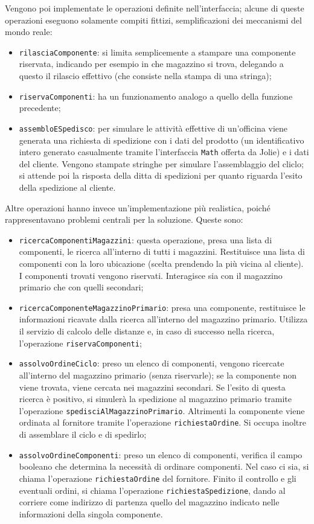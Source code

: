 Vengono poi implementate le operazioni definite nell'interfaccia;
alcune di queste operazioni eseguono solamente compiti fittizi,
semplificazioni dei meccanismi del mondo reale:
\begin{itemize}
  \item {\tt rilasciaComponente}: si limita semplicemente a stampare una
  componente riservata, indicando per esempio in che magazzino si trova,
  delegando a questo il rilascio effettivo (che consiste nella stampa di
  una stringa);
  \item {\tt riservaComponenti}: ha un funzionamento analogo a quello
  della funzione precedente;
  \item {\tt assembloESpedisco}: per simulare le attivit\`a effettive di
  un'officina viene generata una richiesta di spedizione con i dati del
  prodotto (un identificativo intero generato casualmente tramite
  l'interfaccia {\tt Math} offerta da Jolie) e i dati del cliente.
  Vengono stampate stringhe per simulare l'assemblaggio del cliclo; si
  attende poi la risposta della ditta di spedizioni per quanto riguarda
  l'esito della spedizione al cliente.
\end{itemize}
Altre operazioni hanno invece un'implementazione pi\`u realistica,
poich\'e rappresentavano problemi centrali per la soluzione. Queste
sono:
\begin{itemize}
  \item {\tt ricercaComponentiMagazzini}: questa operazione, presa una
  lista di componenti, le ricerca all'interno di tutti i magazzini.
  Restituisce una lista di componenti con la loro ubicazione (scelta
  prendendo la pi\`u vicina al cliente). I componenti trovati vengono
  riservati. Interagisce sia con il magazzino primario che con quelli
  secondari;
  \item {\tt ricercaComponenteMagazzinoPrimario}: presa una componente,
  restituisce le informazioni ricavate dalla ricerca all'interno del
  magazzino primario. Utilizza il servizio di calcolo delle distanze e,
  in caso di successo nella ricerca, l'operazione
  {\tt riservaComponenti};
  \item {\tt assolvoOrdineCiclo}: preso un elenco di componenti, vengono
  ricercate all'interno del magazzino primario (senza riservarle); se la
  componente non viene trovata, viene cercata nei magazzini secondari.
  Se l'esito di questa ricerca \`e positivo, si simuler\`a la spedizione
  al magazzino primario tramite l'operazione
  {\tt spedisciAlMagazzinoPrimario}. Altrimenti la componente viene
  ordinata al fornitore tramite l'operazione {\tt richiestaOrdine}. Si
  occupa inoltre di assemblare il ciclo e di spedirlo;
  \item {\tt assolvoOrdineComponenti}: preso un elenco di componenti,
  verifica il campo booleano che determina la necessit\`a di ordinare
  componenti. Nel caso ci sia, si chiama l'operazione
  {\tt richiestaOrdine} del fornitore. Finito il controllo e gli
  eventuali ordini, si chiama l'operazione \linebreak
  {\tt richiestaSpedizione}, dando al corriere come indirizzo di
  partenza quello del magazzino indicato nelle informazioni della
  singola componente.
\end{itemize}

